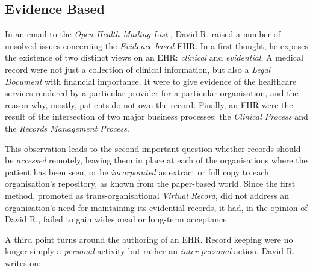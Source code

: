 %
%
%
%
%
%
%

\subsection{Evidence Based}
\label{evidence_based_heading}

In an email to the \emph{Open Health Mailing List} \cite{openhealth}, David R.
raised a number of unsolved issues concerning the \emph{Evidence-based} EHR.
In a first thought, he exposes the existence of two distinct views on an EHR:
\emph{clinical} and \emph{evidential}. A medical record were not just a
collection of clinical information, but also a \emph{Legal Document} with
financial importance. It were to give evidence of the healthcare services
rendered by a particular provider for a particular organisation, and the reason
why, mostly, patients do not own the record. Finally, an EHR were the result of
the intersection of two major business processes: the \emph{Clinical Process}
and the \emph{Records Management Process}.

This observation leads to the second important question whether records should
be \emph{accessed} remotely, leaving them in place at each of the organisations
where the patient has been seen, or be \emph{incorporated} as extract or full
copy to each organisation's repository, as known from the paper-based world.
Since the first method, promoted as trans-organisational \emph{Virtual Record},
did not address an organisation's need for maintaining its evidential records,
it had, in the opinion of David R., failed to gain widespread or long-term
acceptance.

A third point turns around the authoring of an EHR. Record keeping were no
longer simply a \emph{personal} activity but rather an \emph{inter-personal}
action. David R. writes on:

